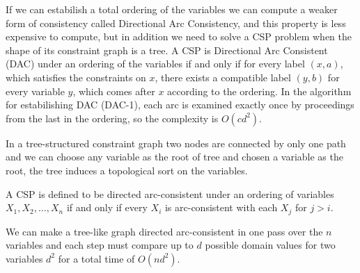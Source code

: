 If we can estabilish a total ordering of the variables we can compute a weaker form
of consistency called Directional Arc Consistency, and this property is less expensive
to compute, but in addition we need to solve a CSP problem when the shape of its 
constraint graph is a tree.\newline
A CSP is Directional Arc Consistent (DAC) under an ordering of the variables if and
only if for every label $(x, a)$, which satisfies the constraints on $x$, there exists
a compatible label $(y, b)$ for every variable $y$, which comes after $x$ according to
the ordering.\newline
In the algorithm for estabilishing DAC (DAC-1), each arc is examined exactly once by
proceedings from the last in the ordering, so the complexity is $O(cd^2)$.

In a tree-structured constraint graph two nodes are connected by only one path and 
we can choose any variable as the root of tree and chosen a variable as the root,
the tree induces a topological sort on the variables.

A CSP is defined to be directed arc-consistent under an ordering of variables $X_1, 
X_2, \dots, X_n$ if and only if every $X_i$ is arc-consistent with each $X_j$ for $j>i$.

We can make a tree-like graph directed arc-consistent in one pass over the $n$ variables
and each step must compare up to $d$ possible domain values for two variables $d^2$
for a total time of $O(nd^2)$.

